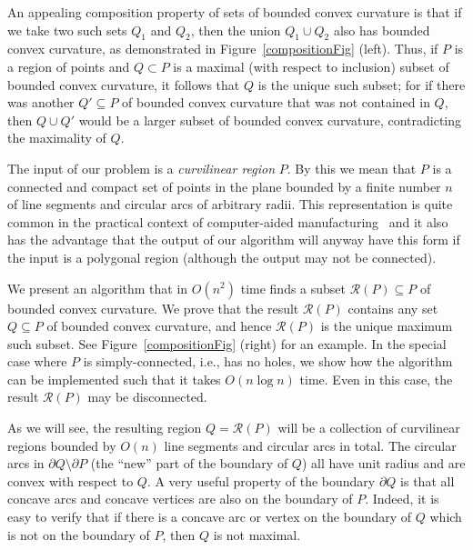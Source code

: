 \documentclass{article}
\newcommand{\PP}{P}
\newcommand{\QQ}{Q}
\newcommand{\round}{\mathcal R}
\begin{document}
An appealing composition property of sets of bounded convex curvature is that if we take two such sets $\QQ_1$ and $\QQ_2$, then the union $\QQ_1\cup\QQ_2$ also has bounded convex curvature, as demonstrated in Figure~\ref{compositionFig} (left).
Thus, if $\PP$ is a region of points and $\QQ\subset\PP$ is a maximal (with respect to inclusion) subset of bounded convex curvature, it follows that $\QQ$ is the unique such subset; for if there was another $\QQ'\subseteq \PP$ of bounded convex curvature that was not contained in $\QQ$, then $\QQ\cup\QQ'$ would be a larger subset of bounded convex curvature, contradicting the maximality of $\QQ$.

The input of our problem is a \emph{curvilinear region} $\PP$.
By this we mean that $\PP$ is a connected and compact set of points in the plane bounded by a finite number $n$ of line segments and circular arcs of arbitrary radii.
This representation is quite common in the practical context of computer-aided manufacturing~\cite{Held2005biarc} and it also has the advantage that the output of our algorithm will anyway have this form if the input is a polygonal region (although the output may not be connected).

We present an algorithm that in $O(n^2)$ time finds a subset $\round(\PP) \subseteq \PP$ of bounded convex curvature.
We prove that the result $\round(\PP)$ contains any set $\QQ \subseteq\PP$ of bounded convex curvature, and hence $\round(\PP)$ is the unique maximum such subset.
See Figure~\ref{compositionFig} (right) for an example.
In the special case where $\PP$ is simply-connected, i.e., has no holes, we show how the algorithm can be implemented such that it takes $O(n\log n)$ time.
Even in this case, the result $\round(\PP)$ may be disconnected.

As we will see, the resulting region $\QQ=\round(\PP)$ will be a collection of curvilinear regions bounded by $O(n)$ line segments and circular arcs in total.
The circular arcs in $\partial\QQ\setminus\partial\PP$ (the ``new'' part of the boundary of $\QQ$) all have unit radius and are convex with respect to $\QQ$.
A very useful property of the boundary $\partial\QQ$ is that all concave arcs and concave vertices are also on the boundary of $\PP$.
Indeed, it is easy to verify that if there is a concave arc or vertex on the boundary of $\QQ$ which is not on the boundary of $\PP$, then $\QQ$ is not maximal.
\end{document}
